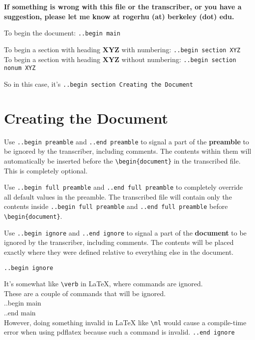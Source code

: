 \documentclass[12pt]{article}
\newcommand{\nl}{\\}
\renewcommand\bold{\textbf}
\numberwithin{equation}{section}
\begin{document}
\bold{If something is wrong with this file or the transcriber, or you have a suggestion, please let me know at rogerhu (at) berkeley (dot) edu.}

\bigskip

To begin the document: \verb|..begin main|

\bigskip

To begin a section with heading \bold{XYZ} with numbering: \verb|..begin section XYZ| \nl
To begin a section with heading \bold{XYZ} without numbering: \verb|..begin section nonum XYZ|

So in this case, it's \verb|..begin section Creating the Document|

\section{Creating the Document}

Use \verb|..begin preamble| and \verb|..end preamble| to signal a part of the \bold{preamble} to be ignored by the transcriber, including comments. The contents within them will automatically be inserted before the \verb|\begin{document}| in the transcribed file. This is completely optional.

\bigskip

Use \verb|..begin full preamble| and \verb|..end full preamble| to completely override all default values in the preamble. The transcribed file will contain only the contents inside \verb|..begin full preamble| and \verb|..end full preamble| before \verb|\begin{document}|.

\bigskip

Use \verb|..begin ignore| and \verb|..end ignore| to signal a part of the \bold{document} to be ignored by the transcriber, including comments. The contents will be placed exactly where they were defined relative to everything else in the document.

\verb|..begin ignore|

It's somewhat like \verb|\verb| in LaTeX, where commands are ignored. \\
These are a couple of commands that will be ignored. \\
..begin main \\
..end main \\
However, doing something invalid in LaTeX like \verb|\nl| would cause a compile-time error when using pdflatex because such a command is invalid. 
\verb|..end ignore|
\end{document}
